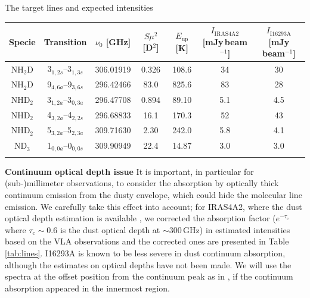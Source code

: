 \documentclass[12pt,a4paper]{article}  %
\begin{document}
\vspace{-1.2em}
\begin{center}
\begin{threeparttable}[tbh]
\caption[]{The target lines and expected intensities}
\begin{tabular}{ccccccc}
\hline \noalign {\smallskip}
Specie & Transition & $\nu_0$ [GHz] & $S\mu^2$ [D$^{2}$] & $E_\mathrm{up}$ [K] & $I_\mathrm{IRAS4A2}$ [mJy\,beam$^{-1}$] & $I_\mathrm{I16293A}$ [mJy beam$^{-1}$] \\
\hline \noalign {\smallskip}
NH$_2$D & 3$_{1,2s}$--3$_{1,3s}$ & 306.01919 & 0.326 & 108.6 & 34 & 30 \\
NH$_2$D & 9$_{4,6a}$--9$_{3,6s}$ & 296.42466 & 83.0 & 825.6 & 83 & 28 \\
NHD$_2$ & 3$_{1,2a}$--3$_{0,3a}$ & 296.47708 & 0.894 & 89.10 & 5.1 & 4.5 \\
NHD$_2$ & 4$_{3,2a}$--4$_{2,2s}$ & 296.68833 & 16.1 & 170.3 & 52 & 43\\
NHD$_2$ & 5$_{3,2a}$--5$_{2,3a}$ & 309.71630 & 2.30 & 242.0 & 5.8 & 4.1\\
ND$_3$ & 1$_{0,0a}$--0$_{0,0s}$ & 309.90949	& 22.4 & 14.87 & 3.0 & 3.0 \\
\hline \noalign {\smallskip}
\end{tabular}
\label{tab:lines}
\end{threeparttable}
\end{center}

\smallskip
\noindent \textbf{Continuum optical depth issue} \quad It is important, in particular for (sub-)millimeter observations, to consider the absorption by optically thick continuum emission from the dusty envelope, which could hide the molecular line emission. We carefully take this effect into account; for IRAS4A2, where the dust optical depth estimation is available \citep[][ with assuming an opacity slope of $\beta=1$]{DeSimone20}, we corrected the absorption factor ($e^{-\tau_\mathrm{c}}$ where $\tau_\mathrm{c}\sim0.6$ is the dust optical depth at $\sim$300\,GHz) in estimated intensities based on the VLA observations and the corrected ones are presented in Table \ref{tab:lines}. I16293A is known to be less severe in dust continuum absorption, although the estimates on optical depths have not been made. We will use the spectra at the offset position from the continuum peak as in \citet{Manigand20}, if the continuum absorption appeared in the innermost region.
\end{document}
